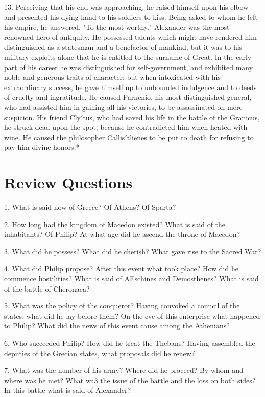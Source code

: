 \documentclass[openany,a4paper]{memoir}
\begin{document}
13. Perceiving that his end was approaching, he raised 
himself upon his elbow and presented his dying hand to his 
soldiers to kiss. Being asked to whom he left his empire, he 
answered, "To the most worthy." Alexander was the most 
renowned hero of antiquity. He possessed talents which 
might have rendered him distinguished as a statesman and a 
benefactor of mankind, but it was to his military exploits 
alone that he is entitled to the surname of Great. In the early 
part of his career he was distinguished for self-government, 
and exhibited many noble and generous traits of character; 
but when intoxicated with his extraordinary success, he gave 
himself up to unbounded indulgence and to deeds of cruelty 
and ingratitude. He caused Parnenio, his most distinguished 
general, who had assisted him in gaining all his victories, to 
be assassinated on mere suspicion. His friend Cly$'$tus, who 
had saved his life in the battle of the Granicus, he struck 
dead upon the spot, because he contradicted him when heated 
with wine. He caused the philosopher Callis$'$tlienes to be 
put to death for refusing to pay him divine honors.* 


\section{Review Questions}

1. What is said now of Greece? Of Athens? Of 
Sparta?

2. How long had the kingdom of Macedon existed? What 
is said of the inhabitants? Of Philip? At what age did he ascend the 
throne of Macedon?

3. What did he possess? What did he cherish? 
What gave rise to the Sacred War? 

4. What did Philip propose? After this event what took place? 
How did he commence hostilities? What is said of AEschines and Demosthenes? What is said of the battle of Cheronaea? 

5. What was 
the policy of the conqueror? Having convoked a council of the states, 
what did he lay before them? On the eve of this enterprise what happened to Philip? What did the news of this event cause among the 
Athenians? 

6. Who succeeded Philip? 
How did he treat the Thebans? Having assembled the deputies of 
the Grecian states, what proposals did he renew? 

7. What was the 
number of his army? Where did he proceed? By whom and where 
was he met? What wa3 the issue of the battle and the loss on both 
sides? In this battle what is said of Alexander? 
\end{document}

